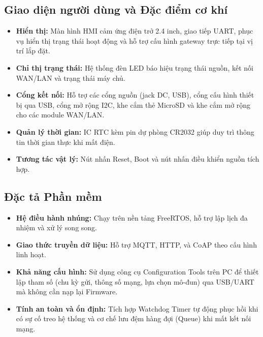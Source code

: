 \subsection{Giao diện người dùng và Đặc điểm cơ khí}
\begin{itemize}
    \item \textbf{Hiển thị:} Màn hình HMI cảm ứng điện trở 2.4 inch, giao tiếp UART, phục vụ hiển thị trạng thái hoạt động và hỗ trợ cấu hình gateway trực tiếp tại vị trí lắp đặt.
    \item \textbf{Chỉ thị trạng thái:} Hệ thống đèn LED báo hiệu trạng thái nguồn, kết nối WAN/LAN và trạng thái máy chủ.
    \item \textbf{Cổng kết nối:} Hỗ trợ các cổng nguồn (jack DC, USB), cổng cấu hình thiết bị qua USB, cổng mở rộng I2C, khe cắm thẻ MicroSD và khe cắm mở rộng cho các module WAN/LAN.
    \item \textbf{Quản lý thời gian:} IC RTC kèm pin dự phòng CR2032 giúp duy trì thông tin thời gian thực khi mất điện.
    \item \textbf{Tương tác vật lý:} Nút nhấn Reset, Boot và nút nhấn điều khiển nguồn tích hợp.
\end{itemize}

\subsection{Đặc tả Phần mềm}
\begin{itemize}
    \item \textbf{Hệ điều hành nhúng:} Chạy trên nền tảng FreeRTOS, hỗ trợ lập lịch đa nhiệm và xử lý song song.
    \item \textbf{Giao thức truyền dữ liệu:} Hỗ trợ MQTT, HTTP, và CoAP theo cấu hình linh hoạt.
    \item \textbf{Khả năng cấu hình:} Sử dụng công cụ Configuration Tools trên PC để thiết lập tham số (chu kỳ gửi, thông số mạng, lựa chọn mô-đun) qua USB/UART mà không cần nạp lại Firmware.
    \item \textbf{Tính an toàn và ổn định:} Tích hợp Watchdog Timer tự động phục hồi khi có sự cố treo hệ thống và cơ chế lưu đệm hàng đợi (Queue) khi mất kết nối mạng.
\end{itemize}